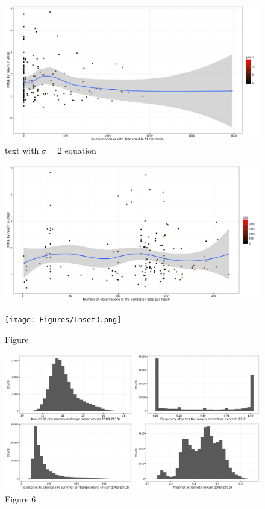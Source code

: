 \documentclass[12pt,]{article}
\begin{document}
\begin{figure}[htbp]
\centering
\includegraphics{Figures/rmse_2010_obs_plot.jpg}
\caption{text with \(\sigma=2\) equation}
\end{figure}

\begin{figure}[htbp]
\centering
\includegraphics{Figures/rmse_2010_valid_obs_plot.jpg}
\caption{}
\end{figure}

\begin{figure}[htbp]
\centering
\texttt{[image: Figures/Inset3.png]}
\caption{Figure}
\end{figure}

\begin{figure}[htbp]
\centering
\includegraphics{Figures/metrics_histograms.jpg}
\caption{Figure 6}
\end{figure}
\end{document}

